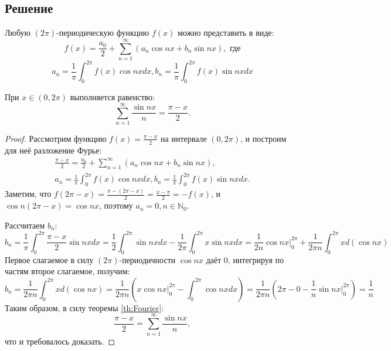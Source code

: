 \documentclass[11pt]{article}
\newcounter{lem}\setcounter{lem}{0}
\def\lm{\par\smallskip\refstepcounter{lem}\textbf{\arabic{lem}}}
\newtheorem*{Lemma}{Лемма \lm}
\newcounter{th}\setcounter{th}{0}
\def\th{\par\smallskip\refstepcounter{th}\textbf{\arabic{th}}}
\newtheorem*{Theorem}{Теорема \th}
\begin{document}
\subsection{Решение}
\label{sec:org3c11a48}
\begin{Theorem}\label{th:Fourier}
Любую $(2\pi)$-периодическую функцию $f(x)$ можно представить в виде:
\begin{equation}
f(x) = \frac{a_0}2 + \sum_{n = 1}^{\infty}(a_n\cos nx + b_n\sin nx), \text{ где}
\end{equation}
\begin{equation*}
a_n = \frac1{\pi}\int_0^{2\pi}f(x)\cos nxdx, b_n = \frac1{\pi}\int_0^{2\pi}f(x)\sin nxdx
\end{equation*}
\end{Theorem}
   \begin{Lemma}
При $x \in (0, 2\pi)$ выполняется равенство:
\begin{equation}\label{eq:lemeq}
\sum_{n = 1}^{\infty}\frac{\sin nx}n = \frac{\pi - x}2.
\end{equation}
   \end{Lemma}
\begin{proof}
Рассмотрим функцию $f(x) = \frac{\pi - x}2$ на интервале $(0, 2\pi)$, и построим для неё разложение Фурье:
\begin{gather*}
\frac{\pi - x}2 = \frac{a_0}2 + \sum_{n = 1}^{\infty}(a_n\cos nx + b_n\sin nx), \\
a_n = \frac1{\pi}\int_0^{2\pi}f(x)\cos nxdx, b_n = \frac1{\pi}\int_0^{2\pi}f(x)\sin nxdx.
\end{gather*}
Заметим, что $f(2\pi - x) = \frac{\pi - (2\pi - x)}2 = \frac{x - \pi}2 = -f(x)$, и $\cos n(2\pi - x) = \cos nx$, поэтому $a_n = 0, n \in \mathbb{N}_0$.

Рассчитаем $b_n$:
\begin{equation*}
b_n = \frac1{\pi}\int_0^{2\pi}\frac{\pi - x}2\sin nxdx = \frac12\int_0^{2\pi}\sin nxdx - \frac1{2\pi}\int_0^{2\pi}x\sin nxdx = \frac1{2n}\cos nx\bigg|_0^{2\pi} + \frac1{2\pi n}\int_0^{2\pi}xd(\cos nx)
\end{equation*}
Первое слагаемое в силу $(2\pi)$-периодичности $\cos nx$ даёт $0$, интегрируя по частям второе слагаемое, получим:
\begin{equation*}
b_n = \frac1{2\pi n}\int_0^{2\pi}xd(\cos nx) = \frac1{2\pi n}\left(x\cos nx\bigg|_0^{2\pi} - \int_0^{2\pi}\cos nxdx\right) = \frac1{2\pi n}\left(2\pi - 0 - \frac1n\sin nx\bigg|_0^{2\pi}\right) = \frac1n
\end{equation*}
Таким образом, в силу теоремы \ref{th:Fourier}:
\begin{equation*}
\frac{\pi - x}2 = \sum_{n = 1}^{\infty}\frac{\sin nx}n,
\end{equation*}
что и требовалось доказать.
\end{proof}
\end{document}
